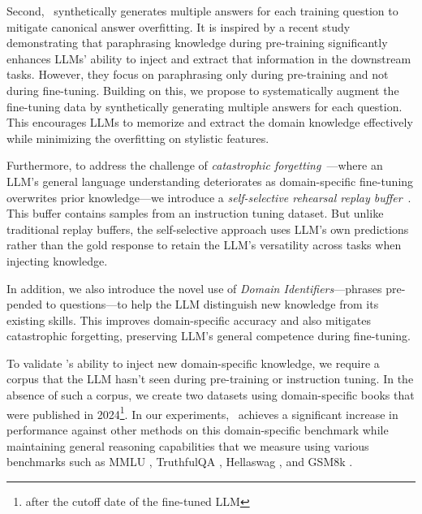 Second, \ourmethodshort\ synthetically generates multiple answers for each training question to mitigate canonical answer overfitting.
It is inspired by a recent study~\citep{allen2024physics} demonstrating that paraphrasing knowledge during pre-training significantly enhances LLMs' ability to inject and extract that information in the downstream tasks. 
However, they focus on paraphrasing only during pre-training and not during fine-tuning.
Building on this, we propose to systematically augment the fine-tuning data by synthetically generating multiple answers for each question. This encourages LLMs to memorize and extract the domain knowledge effectively while minimizing the overfitting on stylistic features.

Furthermore, to address the challenge of \emph{catastrophic forgetting}~\citep{zhang2024dissecting, ke2023continual, jang2021towards}—where an LLM’s general language understanding deteriorates as domain-specific fine-tuning overwrites prior knowledge—we introduce a \emph{self-selective rehearsal replay buffer}~\citep{gupta2024selective, huang2024mitigating}.
This buffer contains samples from an instruction tuning dataset. But unlike traditional replay buffers, the self-selective approach uses LLM’s own predictions rather than the gold response to retain the LLM’s versatility across tasks when injecting knowledge.

In addition, we also introduce the novel use of \emph{Domain Identifiers}—phrases pre-pended to questions—to help the LLM distinguish
new knowledge from its existing skills.
This improves domain-specific accuracy and also mitigates catastrophic forgetting, preserving LLM's general competence during fine-tuning. 

To validate \ourmethodshort's ability to inject new domain-specific knowledge, we require a corpus that the LLM hasn't seen during pre-training or instruction tuning. 
In the absence of such a corpus, we create two datasets using domain-specific books that were published in 2024\footnote{after the cutoff date of the fine-tuned LLM}. 
In our experiments, \ourmethodshort\ achieves a significant increase in performance against other methods on this domain-specific benchmark while maintaining general reasoning capabilities that we measure using various benchmarks such as MMLU \cite{hendrycks2020measuring}, TruthfulQA \cite{lin2022truthfulqa}, Hellaswag \cite{zellers2019hellaswag}, and GSM8k \cite{cobbe2021gsm8k}.
